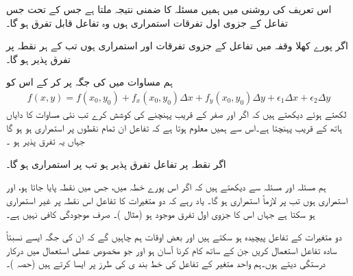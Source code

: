 اس تعریف کی روشنی میں ہمیں مسئلہ  کا  ضمنی نتیجہ ملتا ہے جس کے تحت  جس تفاعل کے   جزوی اول   تفرقات استمراری ہوں وہ تفاعل قابل تفرق ہو گا۔

اگر پورے کھلا وقفہ  میں تفاعل  کے جزوی تفرقات  اور  استمراری ہوں تب  کے ہر نقطہ پر  تفرق پذیر ہو گا۔

  ہم مساوات  میں  کی جگہ  پر کر کے اس کو
\begin{align}\label{مساوات_کثیرالمتغیر_نقطہ_پر_تفاعل_کی_قیمت}
f(x,y)=f(x_0,y_0)+f_x(x_0,y_0)\Delta x+f_y(x_0,y_0)\Delta y+\epsilon_1\Delta x+\epsilon_2\Delta y
\end{align}
لکھتے ہوئے دیکھتے ہیں کہ   اگر  اور  صفر کے قریب پہنچنے کی کوشش کرے   تب نئی مساوات کا دایاں ہاتھ  کے قریب پہنچتا ہے۔اس سے ہمیں معلوم ہوتا ہے کہ تفاعل   ان تمام نقطوں پر  استمراری ہو  ہو گا جہاں یہ تفرق پذیر  ہو ۔

اگر نقطہ  پر تفاعل  تفرق پذیر ہو تب  پر  استمراری ہو گا۔

ہم مسئلہ  اور مسئلہ   سے دیکھتے ہیں کہ  اگر اس پورے  خطہ میں، جس میں  نقطہ  پایا جاتا ہو،      اور  استمراری ہوں تب   پر  لازماً استمراری ہو گا۔  یاد رہے کہ  دو متغیرات کا تفاعل اس نقطہ پر غیر استمراری ہو سکتا ہے جہاں اس  کا جزوی اول تفرق موجود ہو (مثال )۔ صرف موجودگی کافی نہیں ہے۔ 

دو متغیرات کے تفاعل پیچیدہ ہو سکتے ہیں اور بعض اوقات    ہم چاہیں گے کہ  ان کی جگہ  ایسے نسبتاً  سادہ  تفاعل استعمال کریں  جن کے ساتھ کام کرنا  آسان ہو  اور جو  مخصوص عملی  استعمال میں درکار درستگی دیتے ہوں۔ہم      واحد متغیر کے تفاعل  کی خط بند ی  کی طرز پر ایسا    کرتے ہیں (حصہ )۔


